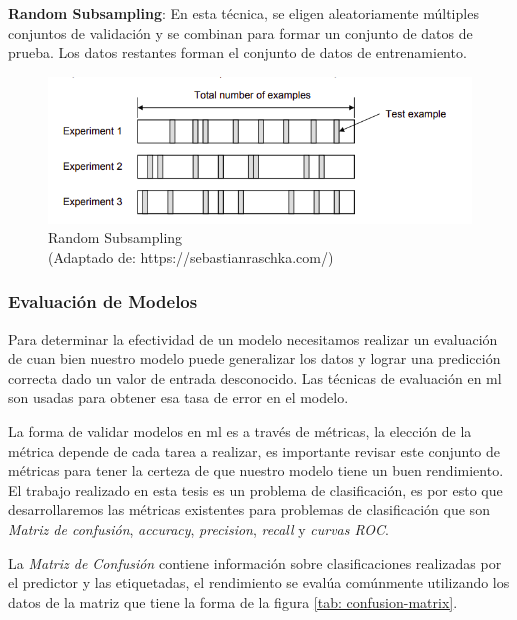 \par \textbf{Random Subsampling}: En esta técnica, se eligen aleatoriamente múltiples conjuntos de validación y se combinan para formar un conjunto de datos de prueba. Los datos restantes forman el conjunto de datos de entrenamiento.

\begin{figure}[H]
 \centering
  \includegraphics[scale=0.5,keepaspectratio=true,clip=true]{imagenes/MarcoTeorico/cross-validation-random.png}
  \caption{Random Subsampling \\ (Adaptado de: https://sebastianraschka.com/)}
	\label{Fig: random-Subsampling}
\end{figure}


\subsubsection{Evaluación de Modelos}\label{sub:evaluación-modelo}
Para determinar la efectividad de un modelo necesitamos realizar un evaluación de cuan bien nuestro modelo puede generalizar los datos y lograr una predicción correcta dado un valor de entrada desconocido. Las técnicas de evaluación en \ac{ml} son usadas para obtener esa tasa de error en el modelo. 

La forma de validar modelos en \ac{ml} es a través de métricas, la elección de la métrica depende de cada tarea a realizar, es importante revisar este conjunto de métricas para tener la certeza de que nuestro modelo tiene un buen rendimiento. El trabajo realizado en esta tesis es un problema de clasificación, es por esto que desarrollaremos las métricas existentes para problemas de clasificación que son \textit{Matriz de confusión}, \textit{accuracy}, \textit{precision}, \textit{recall} y \textit{curvas ROC}.

La \textit{Matriz de Confusión} contiene información sobre clasificaciones realizadas por el predictor y las etiquetadas, el rendimiento  se evalúa comúnmente utilizando los datos de la matriz que tiene la forma de la figura \ref{tab: confusion-matrix}.

